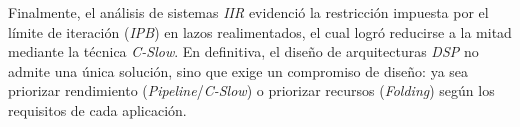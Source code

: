 \documentclass[12pt,a4paper]{article}
\begin{document}
Finalmente, el análisis de sistemas \textit{IIR} evidenció la restricción impuesta por el límite de iteración (\textit{IPB}) en lazos realimentados, el cual logró reducirse a la mitad mediante la técnica \textit{C-Slow}. En definitiva, el diseño de arquitecturas \textit{DSP} no admite una única solución, sino que exige un compromiso de diseño: ya sea priorizar rendimiento (\textit{Pipeline}/\textit{C-Slow}) o priorizar recursos (\textit{Folding}) según los requisitos de cada aplicación.


\newpage
\nocite{*}
\printbibliography[heading=bibintoc, title={4. \ Referencias}]
\end{document}
